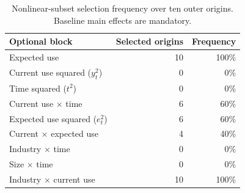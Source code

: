 \begin{table}[H]
\centering
\small
\caption{Nonlinear-subset selection frequency over ten outer origins. Baseline main effects are mandatory.}\label{tab:selection}
\begin{tabular}{lrr}
\toprule
Optional block & Selected origins & Frequency \\
\midrule
Expected use & 10 & 100\% \\
Current use squared ($y_t^2$) & 0 & 0\% \\
Time squared ($t^2$) & 0 & 0\% \\
Current use $\times$ time & 6 & 60\% \\
Expected use squared ($e_t^2$) & 6 & 60\% \\
Current $\times$ expected use & 4 & 40\% \\
Industry $\times$ time & 0 & 0\% \\
Size $\times$ time & 0 & 0\% \\
Industry $\times$ current use & 10 & 100\% \\
\bottomrule
\end{tabular}
\end{table}
